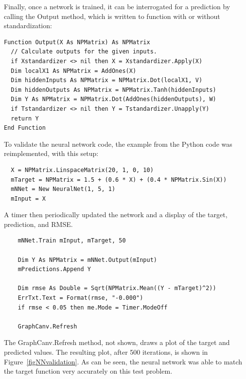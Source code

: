 \documentclass{article}
\begin{document}
Finally, once a network is trained, it can be interrogated for a prediction by calling the Output method, which is written to function with or without standardization:

\begin{lstlisting}
Function Output(X As NPMatrix) As NPMatrix
  // Calculate outputs for the given inputs.
  if Xstandardizer <> nil then X = Xstandardizer.Apply(X)
  Dim localX1 As NPMatrix = AddOnes(X)
  Dim hiddenInputs As NPMatrix = NPMatrix.Dot(localX1, V)
  Dim hiddenOutputs As NPMatrix = NPMatrix.Tanh(hiddenInputs)
  Dim Y As NPMatrix = NPMatrix.Dot(AddOnes(hiddenOutputs), W)
  if Tstandardizer <> nil then Y = Tstandardizer.Unapply(Y)
  return Y
End Function
\end{lstlisting}

To validate the neural network code, the example from the Python code was reimplemented, with this setup:

\begin{lstlisting}
  X = NPMatrix.LinspaceMatrix(20, 1, 0, 10)
  mTarget = NPMatrix = 1.5 + (0.6 * X) + (0.4 * NPMatrix.Sin(X))
  mNNet = New NeuralNet(1, 5, 1)
  mInput = X
\end{lstlisting}

A timer then periodically updated the network and a display of the target, prediction, and RMSE.

\begin{lstlisting}
    mNNet.Train mInput, mTarget, 50
    
    Dim Y As NPMatrix = mNNet.Output(mInput)
    mPredictions.Append Y
    
    Dim rmse As Double = Sqrt(NPMatrix.Mean((Y - mTarget)^2))
    ErrTxt.Text = Format(rmse, "-0.000")
    if rmse < 0.05 then me.Mode = Timer.ModeOff
    
    GraphCanv.Refresh
\end{lstlisting}

The GraphCanv.Refresh method, not shown, draws a plot of the target and predicted values.  The resulting plot, after 500 iterations, is shown in Figure~\ref{figNNvalidation}.  As can be seen, the neural network was able to match the target function very accurately on this test problem.
\end{document}
